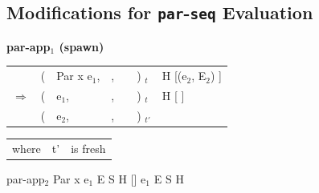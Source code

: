 \documentclass{llncs}
\begin{document}
\subsection{Modifications for \texttt{par}-\texttt{seq} Evaluation}

\noindent \textbf {par-app$_1$ (spawn)}
\par
\medskip
\noindent
\begin{tabular} {p{ 5mm} p{ 2mm} p{20mm} p{25mm} p{15mm} p{ 8mm} p{37mm}}
	& (
	& Par x e$_1$,
	& \raggedleft{[..., \px, ...]},
	& \raggedleft{S}
	& ) $_t$
	& H [\px \bind (e$_2$, E$_2$) ]
	\smallskip
	\\
	$\Rightarrow$
	& (
	& e$_1$,
	& \raggedleft{[..., \px, ...]},
	& \raggedleft{\px : S}
	& ) $_t$
	& H [\px \bind \blockedon{[ ]} ]
	\\
	& (
	& e$_2$,
	& \raggedleft{E$_2$},
	& \raggedleft{[ \#{}\px ]}
	& ) $_{t'}$
	\\
\end{tabular}
\smallskip

\begin{tabular}{p{10mm}ll}
where	& t'	& is fresh
\end{tabular}
\medskip


\rrule	
	{par-app$_2$}
	{Par x e$_1$}	{E}	{S}	{H [\px \bind \blockedon{[ ]}]}
	{e$_1$}		{E}	{S}	{H}
\medskip

%
%
\end{document}
